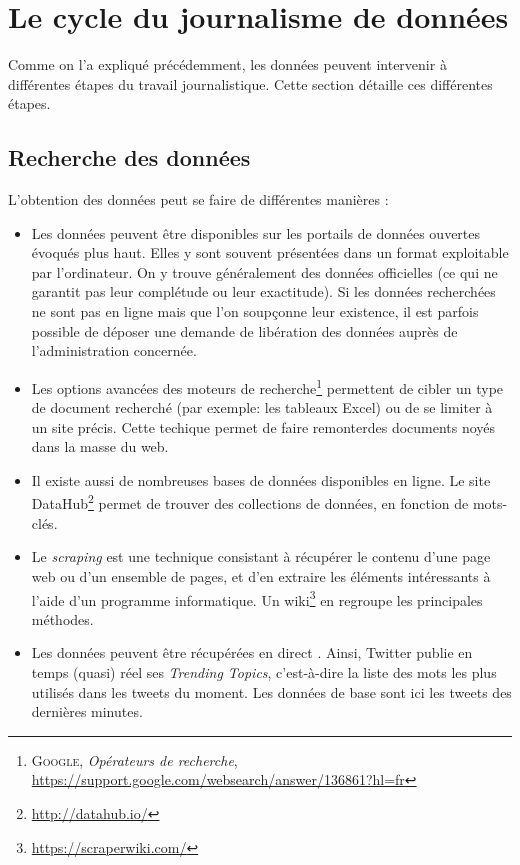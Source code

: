 \section{Le cycle du journalisme de données}
Comme on l'a expliqué précédemment, les données peuvent intervenir à différentes
étapes du travail journalistique. Cette section détaille ces différentes étapes.

\subsection{Recherche des données}
L'obtention des données peut se faire de différentes manières \cite{bradshaw, handbook, handbookfr, joannes} :
\begin{itemize}
\item Les données peuvent être disponibles sur les portails de données ouvertes évoqués 
plus haut. Elles y sont souvent présentées dans un format exploitable par l'ordinateur. 
On y trouve généralement des données officielles (ce qui ne garantit pas leur 
complétude ou leur exactitude). Si les données recherchées ne sont pas en ligne mais 
que l'on soupçonne leur existence, il est parfois possible de déposer une demande de \og libération des données \fg auprès de l'administration concernée.
\item Les options avancées des moteurs de recherche\footnote{\textsc{Google}, \textit{Opérateurs de recherche}, \url{https://support.google.com/websearch/answer/136861?hl=fr}} permettent de cibler un type de 
document recherché (par exemple: les tableaux Excel) ou de se limiter à un site précis. 
Cette techique permet de faire \og remonter\fg des documents noyés dans la masse du web.
\item Il existe aussi de nombreuses bases de données disponibles en ligne. Le site DataHub\footnote{\url{http://datahub.io/}} permet de trouver des collections de données, en fonction de mots-clés.
\item Le \textit{scraping} est une technique consistant à récupérer le contenu d'une page web ou d'un ensemble de pages, et d'en extraire les éléments intéressants à 
l'aide d'un programme informatique. Un wiki\footnote{\url{https://scraperwiki.com/}} en regroupe les principales méthodes.
\item Les données peuvent être récupérées en direct \cite{bradshaw}. Ainsi, Twitter publie en temps (quasi) réel ses \textit{Trending Topics}, c'est-à-dire la liste des mots les plus utilisés
dans les tweets du moment. Les données de base sont ici les tweets des dernières minutes.

\end{itemize}
